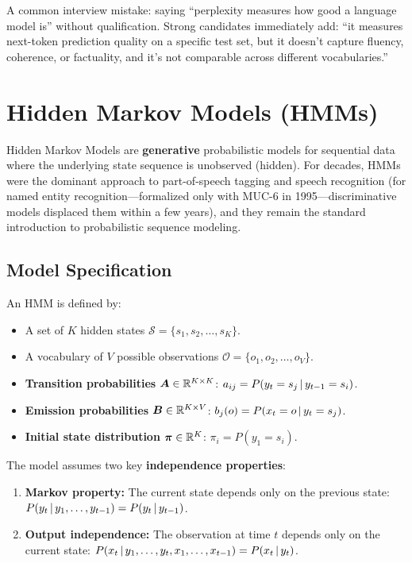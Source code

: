 \begin{warningbox}
A common interview mistake: saying ``perplexity measures how good a language
model is'' without qualification.  Strong candidates immediately add: ``it
measures next-token prediction quality on a specific test set, but it
doesn't capture fluency, coherence, or factuality, and it's not comparable
across different vocabularies.''
\end{warningbox}


\section{Hidden Markov Models (HMMs)}
\label{sec:hmm}

Hidden Markov Models are \textbf{generative} probabilistic models for
sequential data where the underlying state sequence is unobserved (hidden).
For decades, HMMs were the dominant approach to part-of-speech tagging and
speech recognition (for named entity recognition---formalized only with MUC-6
in 1995---discriminative models displaced them within a few years), and they
remain the standard introduction to probabilistic sequence modeling.

\subsection{Model Specification}

An HMM is defined by:

\begin{itemize}
    \item A set of $K$ hidden states $\mathcal{S} = \{s_1, s_2, \ldots, s_K\}$.
    \item A vocabulary of $V$ possible observations $\mathcal{O} = \{o_1, o_2, \ldots, o_V\}$.
    \item \textbf{Transition probabilities} $\bm{A} \in \mathbb{R}^{K \times K}$:
          $a_{ij} = P(y_t = s_j \,|\, y_{t-1} = s_i)$.
    \item \textbf{Emission probabilities} $\bm{B} \in \mathbb{R}^{K \times V}$:
          $b_j(o) = P(x_t = o \,|\, y_t = s_j)$.
    \item \textbf{Initial state distribution} $\bm{\pi} \in \mathbb{R}^K$:
          $\pi_i = P(y_1 = s_i)$.
\end{itemize}

The model assumes two key \textbf{independence properties}:
\begin{enumerate}
    \item \textbf{Markov property:} The current state depends only on the
          previous state: $P(y_t \,|\, y_1, \ldots, y_{t-1}) = P(y_t \,|\, y_{t-1})$.
    \item \textbf{Output independence:} The observation at time $t$ depends
          only on the current state: $P(x_t \,|\, y_1, \ldots, y_t, x_1, \ldots, x_{t-1}) = P(x_t \,|\, y_t)$.
\end{enumerate}

